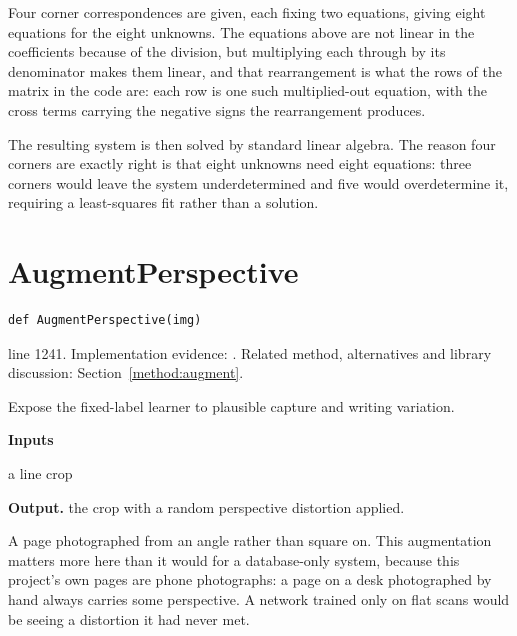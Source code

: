 Four corner correspondences are given, each fixing two equations, giving eight equations for the eight unknowns. The equations above are not linear in the coefficients because of the division, but multiplying each through by its denominator makes them linear, and that rearrangement is what the rows of the matrix in the code are: each row is one such multiplied-out equation, with the cross terms carrying the negative signs the rearrangement produces.

The resulting system is then solved by standard linear algebra. The reason four corners are exactly right is that eight unknowns need eight equations: three corners would leave the system underdetermined and five would overdetermine it, requiring a least-squares fit rather than a solution.



\section{AugmentPerspective}\label{fn:train:AugmentPerspective}
\begin{lstlisting}[style=sig]
def AugmentPerspective(img)
\end{lstlisting}
 line 1241. Implementation evidence: \cite{code2026}. Related method, alternatives and library discussion: Section~\ref{method:augment}.


Expose the fixed-label learner to plausible capture and writing variation.




\noindent\textbf{Inputs}
\begin{description}[leftmargin=2.2em,style=nextline,font=\normalfont\ttfamily]\setlength\itemsep{1pt}
  \item[{img}] \normalfont a line crop
\end{description}

\noindent\textbf{Output.} the crop with a random perspective distortion applied.


A page photographed from an angle rather than square on. This augmentation matters more here than it would for a database-only system, because this project's own pages are phone photographs: a page on a desk photographed by hand always carries some perspective. A network trained only on flat scans would be seeing a distortion it had never met.


